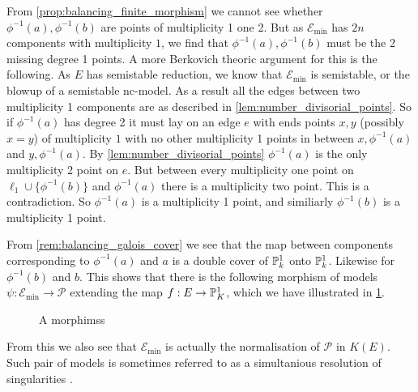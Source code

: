 From \cref{prop:balancing_finite_morphism} we cannot see whether $\phi^{-1}(a), \phi^{-1}(b)$ are points of multiplicity 1 one 2. 
But as $\mathscr E_\text{min} $ has $2n$ components with multiplicity $1$, we find that  $\phi^{-1}(a), \phi^{-1}(b)$ must be the 2 missing degree 1 points. 
A more Berkovich theoric argument for this is the following. 
As $E$ has semistable reduction, we know that $\mathscr E_\text{min} $ is semistable, or the blowup of a semistable nc-model. 
As a result all the edges between two multiplicity 1 components are as described in \cref{lem:number_divisorial_points}.
So if $\phi ^{-1}(a)$ has degree 2 it must lay on an edge $e$ with ends points $x, y$ (possibly $x = y$) of multiplicity $1$ with no other multiplicity 1 points in between $x, \phi^{-1}(a)$ and $y, \phi^{-1}(a)$. 
By \cref{lem:number_divisorial_points} $\phi^{-1}(a)$ is the only multiplicity 2 point on $e$. 
But between every multiplicity one point on $\ell_1 \cup \{\phi^{-1}(b)\} $ and $\phi^{-1}(a)$ there is a multiplicity two point. 
This is a contradiction. 
So $\phi^{-1}(a)$ is a multiplicity 1 point, and similiarly $\phi^{-1}(b)$ is a multiplicity 1 point.  


From \cref{rem:balancing_galois_cover} we see that the map between components corresponding to $\phi^{-1}(a)$ and $a$ is a double cover of $\mathbb{P}^{1}_k$ onto $\mathbb{P}^{1}_k$.
Likewise for $\phi^{-1}(b)$ and $b$. 
This shows that there is the following morphism of models $\psi: \mathscr E_\text{min} \to \mathscr P$ extending the map $f: E \to \mathbb{P}^{1}_K$, which we have illustrated in \cref{fig:morphism_models_semistable_tame}.

\begin{figure}[ht]
    \centering
    \caption{A morphimss }
    \label{fig:morphism_models_semistable_tame}
\end{figure}
From this we also see that $\mathscr E_\text{min} $ is actually the normalisation of $\mathscr P$ in $K(E)$. 
Such pair of models is sometimes referred to as a simultanious resolution of singularities \cite[sec.\ 6]{liuModelsCurvesFinitea}.

